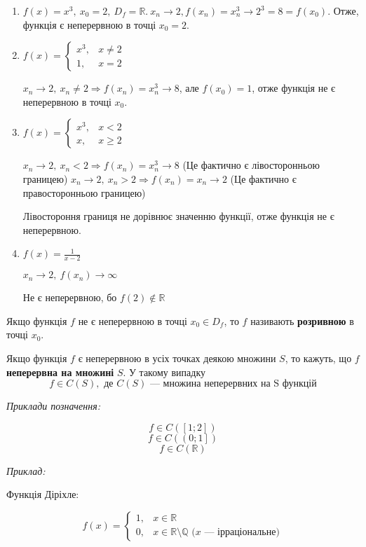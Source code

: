 \documentclass[12pt]{report}
\begin{document}
\begin{enumerate}
    \item $f(x) = x^3,\ x_0 = 2,\ D_f = \mathbb{R}.\ x_n \to 2, f(x_n) = x_{n}^3 \to 2^3 = 8 = f(x_0)$. Отже, функція є неперервною в точці $x_0 = 2$.
    \item $f(x) = \begin{cases} x^3, & x \neq 2  \\ 1, & x = 2\end{cases}$ 
    
    $x_n \to 2,\ x_n \neq 2 \Longrightarrow f(x_n) = x_n^3 \to 8$, але $f(x_0) = 1$, отже функція не є неперервною в точці $x_0$.
    \item $f(x) = \begin{cases} x^3, & x < 2  \\ x, & x \geq 2\end{cases}$
    
    $x_n \to 2,\ x_n < 2 \Longrightarrow f(x_n) = x_n^3 \to 8$ (Це фактично є лівосторонньою границею)
    $x_n \to 2,\ x_n > 2 \Longrightarrow f(x_n) = x_n \to 2$ (Це фактично є правосторонньою границею)
    
    Лівостороння границя не дорівнює значенню функції, отже функція не є неперервною.
    
    \item $f(x) = \frac{1}{x-2}$
    
    $x_n \to 2,\ f(x_n) \to \infty$
    
    Не є неперервною, бо $f(2) \notin \mathbb{R}$ 
\end{enumerate}

Якщо функція $f$ не є неперервною в точці $x_0 \in D_f$, то $f$ називають \textbf{розривною} в точці $x_0$.

Якщо функція $f$ є неперервною в усіх точках деякою множини $S$, то кажуть, що $f$ \textbf{неперервна на множині} $S$. У такому випадку
$$f \in C(S), \textrm{ де $C(S)$ --- множина неперервних на S функцій}$$

\textit{Приклади позначення:}

$$f \in C(\left[ 1;2 \right])$$
$$f \in C( \left( 0;1 \right])$$
$$f \in C(\mathbb{R})$$

\textit{Приклад:}

Функція Діріхле: 

$$f(x) = \begin{cases} 1, & x \in \mathbb{R}  \\ 0, & x \in \mathbb{R}\setminus \mathbb{Q} \textrm{ ($x$ --- ірраціональне)}\end{cases}$$
\end{document}
